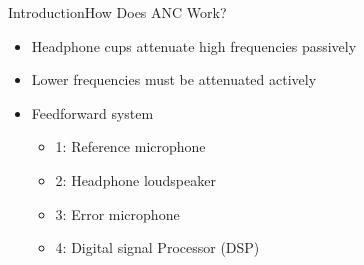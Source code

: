 \begin{frame}{Introduction}{How Does ANC Work?}		
	\begin{itemize}
		\item Headphone cups attenuate high frequencies passively
		\item Lower frequencies must be attenuated actively 
		\item Feedforward system
		\begin{itemize}
			\item 1: Reference microphone
			\item 2: Headphone loudspeaker
			\item 3: Error microphone
			\item 4: Digital signal Processor (DSP)
		\end{itemize}
	\end{itemize}
	\begin{center}
	 	
	\end{center}
\end{frame}



